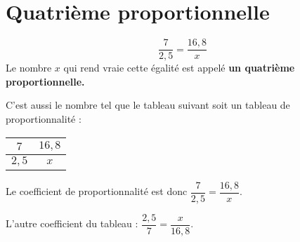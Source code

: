 \section{Quatrième proportionnelle} 

\begin{definition}
   $$\dfrac{7}{2,5}=\dfrac{16,8}{x}$$
   Le nombre $x$ qui rend vraie cette égalité est appelé \textbf{un quatrième proportionnelle.}
\end{definition}

\begin{remarque}
   C'est aussi le nombre tel que le tableau suivant soit un tableau de proportionnalité :
   \begin{tabular}{|c|c|}
   \hline
   $7$&$16,8$\\
   \hline
   $2,5$&$x$\\
   \hline
   \end{tabular}
   \par\vspace{0.25cm}
   Le coefficient de proportionnalité est donc $\dfrac{7}{2,5}=\dfrac{16,8}{x}$.

   L'autre coefficient du tableau : $\dfrac{2,5}{7}=\dfrac{x}{16,8}$.
\end{remarque}

